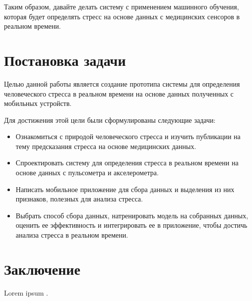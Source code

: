 \documentclass[14pt]{matmex-diploma-custom}
\begin{document}
Таким образом, давайте делать систему с применением машинного обучения, которая
будет определять стресс на основе данных с медицинских сенсоров в реальном
времени.
	
\section{Постановка задачи}
Целью данной работы является создание прототипа системы для определения
человеческого стресса в реальном времени на основе данных полученных с мобильных
устройств.

Для достижения этой цели были сформулированы следующие задачи:

\begin{itemize}
\item Ознакомиться с природой человеческого стресса и изучить публикации на тему
  предсказания стресса на основе медицинских данных.
\item Спроектировать систему для определения стресса в реальном времени на
  основе данных с пульсометра и акселерометра.
\item Написать мобильное приложение для сбора данных и выделения из них
  признаков, полезных для анализа стресса.
\item Выбрать способ сбора данных, натренировать модель на собранных данных,
  оценить ее эффективность и интегрировать ее в приложение, чтобы достичь
  анализа стресса в реальном времени.
\end{itemize}

\section*{Заключение}
Lorem ipsum \cite{saturday_is_monday}.

\setmonofont[Mapping=tex-text]{CMU Typewriter Text}


\end{document}

